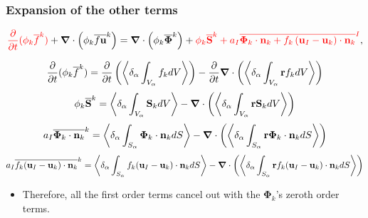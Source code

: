 \documentclass{sintefbeamer}
\newcommand{\nablab}{\bm{\nabla}}
\begin{document}
\begin{frame}
  \frametitle{Expansion of the other terms}
  \begin{equation*}
    \textcolor{red}{\pddt (\phi_k\kavg{f})}
    +\nablab \cdot \left(
        \phi_k \kavg{f \textbf{u}}
    \right)
    = \nablab \cdot \left(
        \phi_k \kavg{\bm{\Phi}}
    \right)
    + \textcolor{red}{\phi_k \kavg{\textbf{S}}
    + a_I \Iavg{
        \bm{\Phi}_k \cdot \textbf{n}_k
        + f_k 
        \left(
            \textbf{u}_I
            - \textbf{u}_k
        \right) \cdot \textbf{n}_k
    }},
\end{equation*}
  
\begin{equation*}
  \pddt (\phi_k\kavg{f})
  = \pddt \left(\pavg{\int_{V_\alpha} f_k dV}\right)
  - \pddt\nablab \cdot \left(\pavg{\int_{V_\alpha} \textbf{r} f_k dV}\right)
\end{equation*}
\begin{equation*}
  \phi_k\kavg{\textbf{S}}
  =  \pavg{\int_{V_\alpha} \textbf{S}_k dV}
  - \nablab \cdot \left(\pavg{\int_{V_\alpha} \textbf{r} \textbf{S}_k dV}\right)
\end{equation*}
\begin{equation*}
  a_I\kavg{\bm{\Phi}_k \cdot \textbf{n}_k}
  =  \pavg{\int_{S_\alpha} \bm{\Phi}_k \cdot \textbf{n}_k dS}
  - \nablab \cdot \left(\pavg{\int_{S_\alpha} \textbf{r} \bm{\Phi}_k \cdot \textbf{n}_k dS}\right)
\end{equation*}
\begin{equation*}
  a_I\kavg{f_k (\textbf{u}_I - \textbf{u}_k) \cdot \textbf{n}_k}
  =  \pavg{\int_{S_\alpha} f_k (\textbf{u}_I - \textbf{u}_k) \cdot \textbf{n}_k dS}
  - \nablab \cdot \left(\pavg{\int_{S_\alpha} \textbf{r} f_k (\textbf{u}_I - \textbf{u}_k) \cdot \textbf{n}_k dS}\right)
\end{equation*}
\begin{itemize}
  \item Therefore, all the first order terms cancel out with the $\mathbf{\Phi}_k$'s zeroth order terms.
\end{itemize}
\end{frame}
\end{document}
